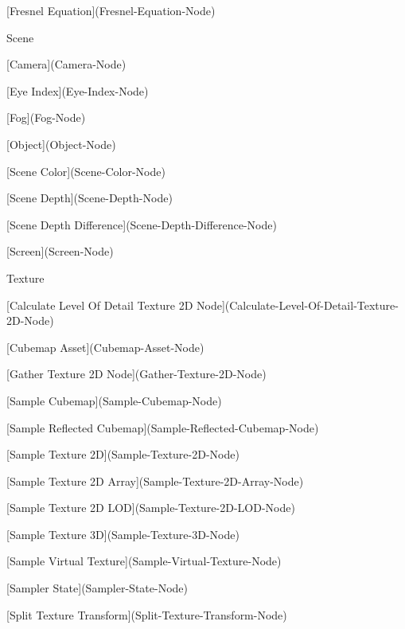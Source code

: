 \begin{DoxyItemize}
\begin{DoxyItemize}
\begin{DoxyItemize}
\begin{DoxyItemize}
\item \mbox{[}Fresnel Equation\mbox{]}(Fresnel-\/\+Equation-\/\+Node)
\end{DoxyItemize}
\item Scene
\begin{DoxyItemize}
\item \mbox{[}Camera\mbox{]}(Camera-\/\+Node)
\item \mbox{[}Eye Index\mbox{]}(Eye-\/\+Index-\/\+Node)
\item \mbox{[}Fog\mbox{]}(Fog-\/\+Node)
\item \mbox{[}Object\mbox{]}(Object-\/\+Node)
\item \mbox{[}Scene Color\mbox{]}(Scene-\/\+Color-\/\+Node)
\item \mbox{[}Scene Depth\mbox{]}(Scene-\/\+Depth-\/\+Node)
\item \mbox{[}Scene Depth Difference\mbox{]}(Scene-\/\+Depth-\/\+Difference-\/\+Node)
\item \mbox{[}Screen\mbox{]}(Screen-\/\+Node)
\end{DoxyItemize}
\item Texture
\begin{DoxyItemize}
\item \mbox{[}Calculate Level Of Detail Texture 2D Node\mbox{]}(Calculate-\/\+Level-\/\+Of-\/\+Detail-\/\+Texture-\/2\+D-\/\+Node)
\item \mbox{[}Cubemap Asset\mbox{]}(Cubemap-\/\+Asset-\/\+Node)
\item \mbox{[}Gather Texture 2D Node\mbox{]}(Gather-\/\+Texture-\/2\+D-\/\+Node)
\item \mbox{[}Sample Cubemap\mbox{]}(Sample-\/\+Cubemap-\/\+Node)
\item \mbox{[}Sample Reflected Cubemap\mbox{]}(Sample-\/\+Reflected-\/\+Cubemap-\/\+Node)
\item \mbox{[}Sample Texture 2D\mbox{]}(Sample-\/\+Texture-\/2\+D-\/\+Node)
\item \mbox{[}Sample Texture 2D Array\mbox{]}(Sample-\/\+Texture-\/2\+D-\/\+Array-\/\+Node)
\item \mbox{[}Sample Texture 2D LOD\mbox{]}(Sample-\/\+Texture-\/2\+D-\/\+LOD-\/\+Node)
\item \mbox{[}Sample Texture 3D\mbox{]}(Sample-\/\+Texture-\/3\+D-\/\+Node)
\item \mbox{[}Sample Virtual Texture\mbox{]}(Sample-\/\+Virtual-\/\+Texture-\/\+Node)
\item \mbox{[}Sampler State\mbox{]}(Sampler-\/\+State-\/\+Node)
\item \mbox{[}Split Texture Transform\mbox{]}(Split-\/\+Texture-\/\+Transform-\/\+Node)

\end{DoxyItemize}
\end{DoxyItemize}
\end{DoxyItemize}
\end{DoxyItemize}
